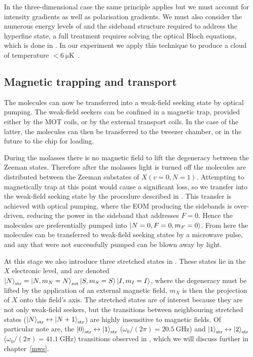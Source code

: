 In the three-dimensional case the same principle applies but we must account
for intensity gradients as well as polarisation gradients. We must also
consider the numerous energy levels of \CaF{} and the sideband structure
required to address the hyperfine state, a full treatment requires solving the
optical Bloch equations, which is done in .
In our experiment we apply this technique to produce a \CaF{} cloud of
temperature $<\SI{6}{\micro\kelvin}$~\cite{PhysRevLett.123.033202}.

\subsection*{Magnetic trapping and transport}

The molecules can now be transferred into a weak-field seeking state by optical
pumping. The weak-field seekers can be confined in a magnetic trap, provided
either by the MOT coils, or by the external transport coils. In the case of the
latter, the molecules can then be transferred to the tweezer chamber, or in the
future to the chip for loading.

During the molasses there is no magnetic field to lift the degeneracy between
the Zeeman states. Therefore after the molasses light is turned off the
molecules are distributed between the Zeeman substates of $X(v=0, N=1)$.
Attempting to magnetically trap at this point would cause a significant loss,
so we transfer into the weak-field seeking state by the procedure described in
. This transfer is achieved with optical
pumping, where the EOM producing the  sidebands is over-driven,
reducing the power in the sideband that addresses $F=0$. Hence the molecules
are preferentially pumped into $\ket{N=0, F=0, m_F=0}$. From here the molecules can 
be transferred to weak-field seeking states by a microwave pulse, and any that
were not successfully pumped can be blown away by  light.

At this stage we also introduce three stretched states in \CaF{}. These states
lie in the $X$ electronic level, and are denoted $\ket{N}_\text{str} = \ket{N,
m_N=N}_\text{rot}\ket{S, m_S=S}\ket{I,m_I=I}$, where the degeneracy must be
lifted by the application of an external magnetic field, $m_X$ is then the
projection of $X$ onto this field's axis. The stretched states are of interest
because they are not only weak-field seekers, but the transitions between
neighbouring stretched states
($\ket{N}_\text{str}\leftrightarrow\ket{N+1}_\text{str}$) are highly
insensitive to magnetic fields. Of particular note are, the
$\ket{0}_\text{str}\leftrightarrow\ket{1}_\text{str}$ ($\omega_0/(2\pi) =
\SI{20.5}{\giga\hertz}$) and
$\ket{1}_\text{str}\leftrightarrow\ket{2}_\text{str}$ ($\omega_0/(2\pi) =
\SI{41.1}{\giga\hertz}$) transitions observed in
, which we will discuss further in
chapter~\ref{mws}.

